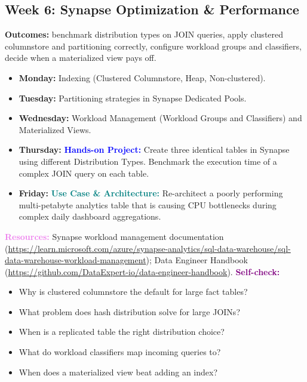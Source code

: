 \documentclass[11pt, a4paper]{article}
\newcommand{\project}[1]{\vspace{1mm}\noindent\textbf{\textcolor{blue}{Hands-on Project:}} #1}
\newcommand{\usecase}[1]{\vspace{1mm}\noindent\textbf{\textcolor{teal}{Use Case \& Architecture:}} #1}
\newcommand{\dayitem}[2]{\item \textbf{#1:} #2}
\newcommand{\resources}[1]{\vspace{1mm}\noindent\textbf{\textcolor{violet}{Resources:}} #1}
\newcommand{\selfcheck}[1]{\vspace{1mm}\noindent\textbf{\textcolor{purple}{Self-check:}} #1}
\begin{document}
\subsection*{Week 6: Synapse Optimization \& Performance}
\par\noindent\textbf{Outcomes:} benchmark distribution types on JOIN queries, apply clustered columnstore and partitioning correctly, configure workload groups and classifiers, decide when a materialized view pays off.
\begin{itemize}[label=-]
    \dayitem{Monday}{Indexing (Clustered Columnstore, Heap, Non-clustered).}
    \dayitem{Tuesday}{Partitioning strategies in Synapse Dedicated Pools.}
    \dayitem{Wednesday}{Workload Management (Workload Groups and Classifiers) and Materialized Views.}
    \dayitem{Thursday}{\project{Create three identical tables in Synapse using different Distribution Types. Benchmark the execution time of a complex JOIN query on each table.}}
    \dayitem{Friday}{\usecase{Re-architect a poorly performing multi-petabyte analytics table that is causing CPU bottlenecks during complex daily dashboard aggregations.}}
\end{itemize}
\resources{Synapse workload management documentation (\url{https://learn.microsoft.com/azure/synapse-analytics/sql-data-warehouse/sql-data-warehouse-workload-management}); Data Engineer Handbook (\url{https://github.com/DataExpert-io/data-engineer-handbook}).}
\selfcheck{\begin{itemize}[label=-, itemsep=0pt]
    \item Why is clustered columnstore the default for large fact tables?
    \item What problem does hash distribution solve for large JOINs?
    \item When is a replicated table the right distribution choice?
    \item What do workload classifiers map incoming queries to?
    \item When does a materialized view beat adding an index?
\end{itemize}}
\end{document}
